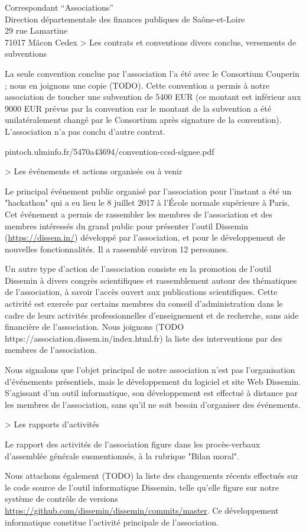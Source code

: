 \documentclass[11pt]{lettre}
\begin{document}
\begin{letter}{Correspondant ``Associations''\\Direction départementale des finances publiques de Saône-et-Loire\\29 rue Lamartine\\71017 Mâcon Cedex}
    > Les contrats et conventions divers conclus, versements de subventions

La seule convention conclue par l'association l'a été avec le Consortium Couperin ; nous en joignons une copie (TODO). Cette convention a permis à notre association de toucher une subvention de 5400 EUR (ce montant est inférieur aux 9000 EUR prévus par la convention car le montant de la subvention a été unilatéralement changé par le Consortium après signature de la convention). L'association n'a pas conclu d'autre contrat.

pintoch.ulminfo.fr/5470a43694/convention-ccsd-signee.pdf

    > Les événements et actions organisés ou à venir

Le principal événement public organisé par l'association pour l'instant a été un "hackathon" qui a eu lieu le 8 juillet 2017 à l'École normale supérieure à Paris. Cet événement a permis de rassembler les membres de l'association et des membres intéressés du grand public pour présenter l'outil Dissemin (\url{https://dissem.in/}) développé par l'association, et pour le développement de nouvelles fonctionnalités. Il a rassemblé environ 12 personnes.

Un autre type d'action de l'association consiste en la promotion de l'outil Dissemin à divers congrès scientifiques et rassemblement autour des thématiques de l'association, à savoir l'accès ouvert aux publications scientifiques. Cette activité est exercée par certains membres du conseil d'administration dans le cadre de leurs activités professionnelles d'enseignement et de recherche, sans aide financière de l'association. Nous joignons (TODO https://association.dissem.in/index.html.fr) la liste des interventions par des membres de l'association.

Nous signalons que l'objet principal de notre association n'est pas l'organisation d'événements présentiels, mais le développement du logiciel et site Web Dissemin. S'agissant d'un outil informatique, son développement est effectué à distance par les membres de l'association, sans qu'il ne soit besoin d'organiser des événements.

    > Les rapports d'activités

Le rapport des activités de l'association figure dans les procès-verbaux d'assemblée générale susmentionnés, à la rubrique "Bilan moral".

Nous attachons également (TODO) la liste des changements récents effectués sur le code source de l'outil informatique Dissemin, telle qu'elle figure sur notre système de contrôle de versions \url{https://github.com/dissemin/dissemin/commits/master}. Ce développement informatique constitue l'activité principale de l'association.


\end{letter}
\end{document}
